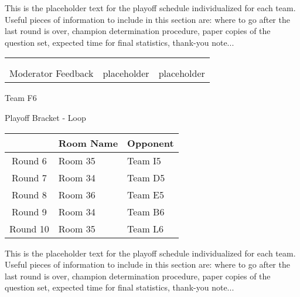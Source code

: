 \documentclass{article}%
\begin{document}
\vspace*{30pt}%
\linebreak%
This is the placeholder text for the playoff schedule individualized for each team. Useful pieces of information to include in this section are: where to go after the last round is over, champion determination procedure, paper copies of the question set, expected time for final statistics, thank{-}you note...%
\vspace*{30pt}%
\newline%
%
\begin{tabularx}{\textwidth}{YYY}%
  &  &  \\%
\\%
Moderator Feedback&placeholder&placeholder\\%
\end{tabularx}%
\newpage%
\begin{center}%
\begin{Huge}%
Team F6%
\end{Huge}%
\vspace*{12pt}%
\linebreak%
\begin{Large}%
Playoff Bracket {-} Loop%
\end{Large}%
\end{center}%
\vspace*{4pt}%
%
\begin{tabularx}{\textwidth}{|c|Y|Y|}%
\hline%
&Room Name&Opponent\\%
\hline%
Round 6&Room 35&Team I5\\%
Round 7&Room 34&Team D5\\%
Round 8&Room 36&Team E5\\%
Round 9&Room 34&Team B6\\%
Round 10&Room 35&Team L6\\%
\hline%
\end{tabularx}%
\vspace*{30pt}%
\linebreak%
This is the placeholder text for the playoff schedule individualized for each team. Useful pieces of information to include in this section are: where to go after the last round is over, champion determination procedure, paper copies of the question set, expected time for final statistics, thank{-}you note...%
\vspace*{30pt}%
\end{document}
